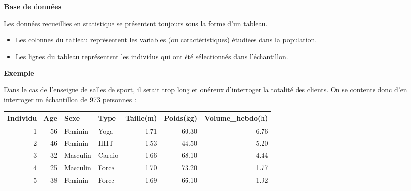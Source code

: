 \documentclass[aspectratio=169,xcolor=dvipsnames]{beamer}
\begin{document}
\begin{frame}

	\begin{block}{\textbf{Base de données}}
\begin{footnotesize}
	Les données recueillies en statistique se présentent toujours sous la forme d'un tableau.
		\begin{itemize}
		\item Les colonnes du tableau représentent les variables (ou caractéristiques) étudiées dans la population.
		\item Les lignes du tableau représentent les individus qui ont été sélectionnés dans l'échantillon.
		\end{itemize}
\end{footnotesize}
	\end{block}
	
	\begin{exampleblock}{\textbf{Exemple}}
\begin{footnotesize}
	Dans le cas de l'enseigne de salles de sport, il serait trop long et onéreux d'interroger la totalité des clients. On se contente donc d'en interroger un échantillon de 973 personnes :
			\begin{center}
		\begin{tabular}{rrllrrr}
  \hline
Individu & Age & Sexe & Type & Taille(m) & Poids(kg) & Volume\_hebdo(h) \\ 
  \hline
1 &  56 & Feminin & Yoga & 1.71 & 60.30 & 6.76 \\ 
  2 &  46 & Feminin & HIIT & 1.53 & 44.50 & 5.20 \\ 
  3 &  32 & Masculin & Cardio & 1.66 & 68.10 & 4.44 \\ 
  4 &  25 & Masculin & Force & 1.70 & 73.20 & 1.77 \\ 
  5 &  38 & Feminin & Force & 1.69 & 66.10 & 1.92 \\ 
   \hline
		\end{tabular}
		\end{center}
\end{footnotesize}
	\end{exampleblock}
\end{frame}
\end{document}
